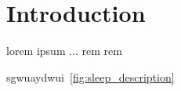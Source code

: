 \section{Introduction} \label{intro}

lorem ipsum ...
\Gls{rem}
\Gls{rem}


sgwuaydwui~\ref{fig:sleep_description}

